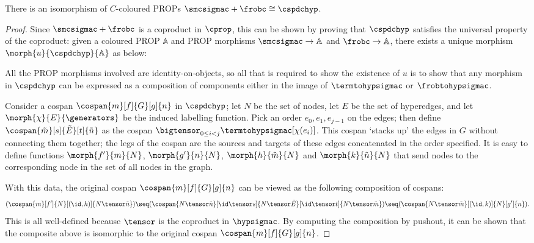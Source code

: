 \begin{theorem}
    \label{thm:isomorphism-smcfrob-cospans}
    There is an isomorphism of \(C\)-coloured PROPs
    \(\smcsigmac + \frobc \cong \cspdchyp\).
\end{theorem}
\begin{proof}
    Since \(\smcsigmac + \frobc\) is a coproduct in \(\cprop\), this can be
    shown by proving that \(\cspdchyp\) satisfies the universal property of the
    coproduct: given a coloured PROP \(\mathbb{A}\) and PROP morphisms
    \(\smcsigmac \to \mathbb{A}\) and \(\frobc \to \mathbb{A}\), there exists
    a unique morphism \(\morph{u}{\cspdchyp}{\mathbb{A}}\) as below:
    \begin{center}
        
    \end{center}
    All the PROP morphisms involved are identity-on-objects, so all that is
    required to show the existence of \(u\) is to show that any morphism in
    \(\cspdchyp\) can be expressed as a composition of components either in the
    image of \(\termtohypsigmac\) or \(\frobtohypsigmac\).

    Consider a cospan \(\cospan{m}[f]{G}[g]{n}\) in \(\cspdchyp\); let \(N\) be
    the set of nodes, let \(E\) be the set of hyperedges, and let
    \(\morph{\chi}{E}{\generators}\) be the induced labelling function.
    Pick an order \(e_0, e_1, e_{j-1}\) on the edges; then define \(
        \cospan{\tilde{m}}[s]{\tilde{E}}[t]{\tilde{n}}
    \) as the cospan \(
        \bigtensor_{0 \leq i < j}
        \termtohypsigmac[\chi(e_i)]
    \).
    This cospan `stacks up' the edges in \(G\) without connecting them together;
    the legs of the cospan are the sources and targets of these
    edges concatenated in the order specified.
    It is easy to define functions \(\morph{f^\prime}{m}{N}\),
    \(\morph{g^\prime}{n}{N}\), \(\morph{h}{\tilde{m}}{N}\) and
    \(\morph{k}{\tilde{n}}{N}\) that send nodes to the corresponding node in the
    set of all nodes in the graph.

    With this data, the original cospan \(\cospan{m}[f]{G}[g]{n}\) can be
    viewed as the following composition of cospans: \[
        (
            \cospan{m}[f^\prime]{N}[(\id,h)]{N \tensor \tilde{n}}
        ) \seq (
            \cospan{
                N \tensor \tilde{n}
            }[
                \id \tensor s
            ]{
                N \tensor \tilde{E}
            }[
                \id \tensor t
            ]{
                N \tensor \tilde{m}
            }
        ) \seq (
            \cospan{N \tensor \tilde{m}}[(\id, k)]{N}[g^\prime]{n}
        ).
    \]
    This is all well-defined because \(\tensor\) is the coproduct in
    \(\hypsigmac\).
    By computing the composition by pushout, it can be shown that the composite
    above is isomorphic to the original cospan \(\cospan{m}[f]{G}[g]{n}\).


\end{proof}
